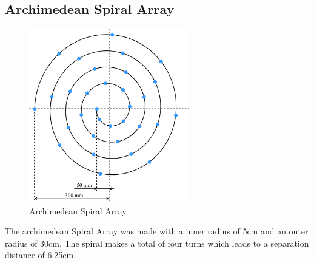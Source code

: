 \subsection{Archimedean Spiral Array}
\begin{minipage}{\linewidth}
	\begin{figure}
		\vspace{-0.8cm}
		\includegraphics[width=7cm]{images/5_array_evaluation/prototype_array_archimedian_spiral.pdf}
		\centering
		\caption{Archimedean Spiral Array}
		\label{fig:prototype_array_archimedian_spiral}
	\end{figure}
	The archimedean Spiral Array was made with a inner radius of 5cm and an outer radius of 
	30cm. The spiral makes a total of four turns which leads to a 
	separation distance of 6.25cm.

\end{minipage}
\newpage





